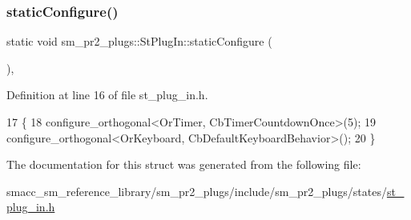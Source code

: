 \subsubsection{\texorpdfstring{static\+Configure()}{staticConfigure()}}
{\footnotesize\ttfamily static void sm\+\_\+pr2\+\_\+plugs\+::\+St\+Plug\+In\+::static\+Configure (\begin{DoxyParamCaption}{ }\end{DoxyParamCaption})\hspace{0.3cm}{\ttfamily [inline]}, {\ttfamily [static]}}



Definition at line 16 of file st\+\_\+plug\+\_\+in.\+h.


\begin{DoxyCode}
17     \{
18         configure\_orthogonal<OrTimer,  CbTimerCountdownOnce>(5);    
19         configure\_orthogonal<OrKeyboard, CbDefaultKeyboardBehavior>();
20     \}
\end{DoxyCode}


The documentation for this struct was generated from the following file\+:\begin{DoxyCompactItemize}
\item 
smacc\+\_\+sm\+\_\+reference\+\_\+library/sm\+\_\+pr2\+\_\+plugs/include/sm\+\_\+pr2\+\_\+plugs/states/\hyperlink{st__plug__in_8h}{st\+\_\+plug\+\_\+in.\+h}\end{DoxyCompactItemize}
